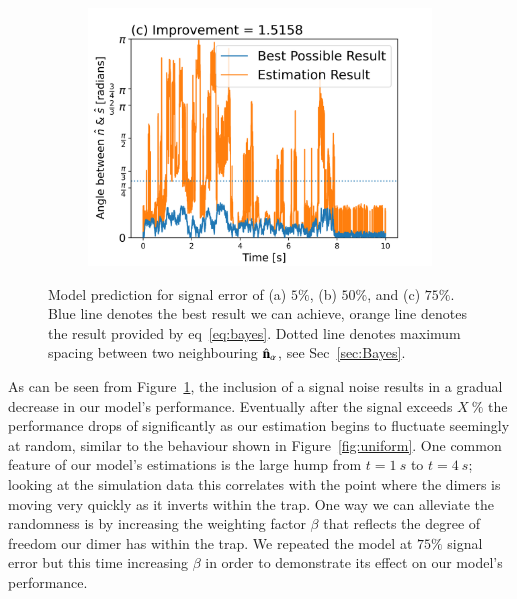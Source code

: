 \documentclass[final,  3p]{elsarticle}
\begin{document}
\begin{figure}[h]
\begin{subfigure}{0.32\textwidth}
		\includegraphics[width=\textwidth]{./Images/fig6c.png}
	\end{subfigure}
	\caption{Model prediction for signal error of (a) $5\%$, (b) $50\%$, and (c) $75\%$. Blue line denotes the best result we can achieve, orange line denotes the result provided by eq~\ref{eq:bayes}. Dotted line denotes maximum spacing between two neighbouring $\hat{\bf n}_\alpha$, see Sec~\ref{sec:Bayes}.}
	\label{fig:epsilon}
\end{figure}

As can be seen from Figure~\ref{fig:epsilon}, the inclusion of a signal noise results in a gradual decrease in our model's performance. Eventually after the signal exceeds $X \ \%$ the performance drops of significantly as our estimation begins to fluctuate seemingly at random, similar to the behaviour shown in Figure~\ref{fig:uniform}. One common feature of our model's estimations is the large hump from $t = 1 \ s$ to $t = 4 \ s$; looking at the simulation data this correlates with the point where the dimers is moving very quickly as it inverts within the trap. One way we can alleviate the randomness is by increasing the weighting factor $\beta$ that reflects the degree of freedom our dimer has within the trap. We repeated the model at $75\%$ signal error but this time increasing $\beta$ in order to demonstrate its effect on our model's performance. 
\end{document}
